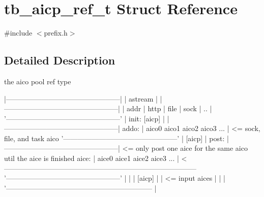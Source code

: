 \hypertarget{structtb__aicp__ref__t}{\section{tb\-\_\-aicp\-\_\-ref\-\_\-t Struct Reference}
\label{structtb__aicp__ref__t}
}


{\ttfamily \#include $<$prefix.\-h$>$}



\subsection{Detailed Description}
the aico pool ref type


\begin{DoxyPre}
      |------------------------------------------------|
      |                   astream                      |
      |------------------------------------------------|
      |  addr  | http | file | sock |      ..          | 
      '------------------------------------------------'
                            |
init:                    [aicp]
                            |
      |------------------------------------------------|
addo: | aico0   aico1   aico2   aico3      ...         | <= sock, file, and task aico
      '------------------------------------------------'
                            | 
                         [aicp]
                            |
post: |------------------------------------------------| <= only post one aice for the same aico util the aice is finished
aice: | aice0   aice1   aice2   aice3      ...         | <---------------------------------------------------------------------------------
      '------------------------------------------------'                                                                                  |
                            |                                                                                                             |
                         [aicp]                                                                                                           |
                            |         <= input aices                                                                                      |
                            |                                                                                                             |
                            '--------------------------------------------------------------                                               | 

\end{DoxyPre}
